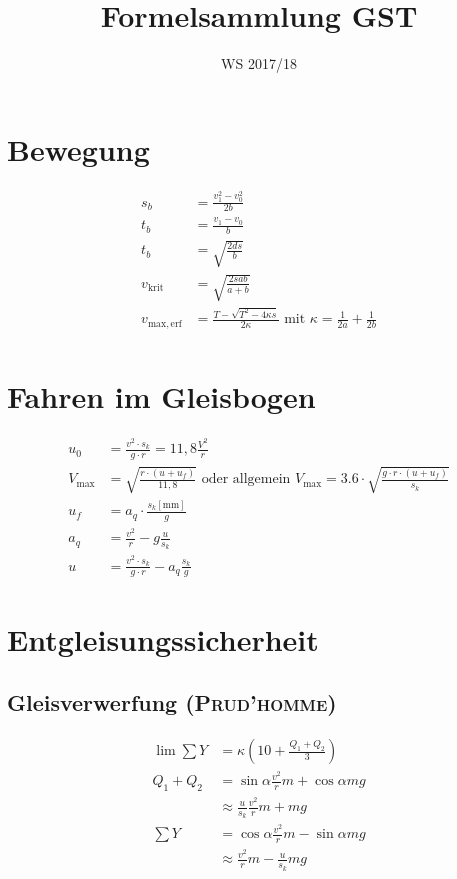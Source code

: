 \documentclass{scrartcl}
\title{Formelsammlung GST}
\date{WS 2017/18}
\begin{document}
	\maketitle
	\section{Bewegung}
	\begin{align*}
		s_b &= \frac{v_1^2 - v_0^2}{2b} \\
		t_b &= \frac{v_1 - v_0}{b} \\
		t_b &= \sqrt{\frac{2ds}{b}} \\
		v_\mathrm{krit} &= \sqrt{\frac{2sab}{a+b}} \\
		v_\mathrm{max,erf} &= \frac{T-\sqrt{T^2-4\kappa{}s}}{2\kappa} \text{ mit } \kappa = \frac{1}{2a}+\frac{1}{2b} \\
	\end{align*}

	\section{Fahren im Gleisbogen}
	\begin{align*}
		u_0 &= \frac{v^2 \cdot s_k}{g\cdot r} = 11,8\frac{V^2}{r} \\
		V_{\text{max}} &= \sqrt{\frac{r\cdot(u+u_f)}{11,8}} \text{ oder allgemein } V_{\text{max}} = 3.6 \cdot \sqrt{\frac{g\cdot r \cdot (u + u_f)}{s_k}} \\
		u_f &= a_q \cdot \frac{s_k[\mathrm{mm}]}{g} \\
		a_q &= \frac{v^2}{r} - g\frac{u}{s_k} \\
		u &= \frac{v^2 \cdot s_k}{g\cdot r} - a_q\frac{s_k}{g}
	\end{align*}

	\section{Entgleisungssicherheit}
	\subsection{Gleisverwerfung (\textsc{Prud'homme})}
	\begin{align*}
		\lim\sum{}Y &= \kappa\left(10+\frac{Q_1+Q_2}{3}\right) \\
		Q_1+Q_2 &= \sin\alpha\frac{v^2}{r}m+\cos\alpha{}mg \\
						&\approx \frac{u}{s_k}\frac{v^2}{r}m+mg \\
		\sum{}Y &= \cos\alpha\frac{v^2}{r}m-\sin\alpha{}mg \\
						&\approx \frac{v^2}{r}m - \frac{u}{s_k}mg
	\end{align*}
\end{document}
